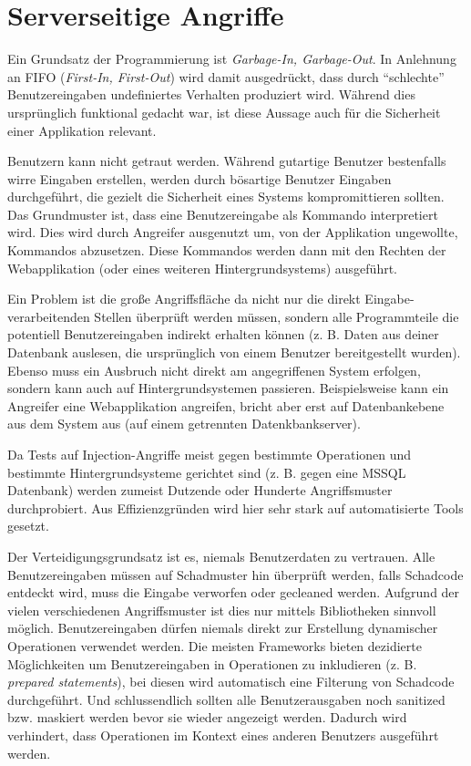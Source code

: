 \chapter{Serverseitige Angriffe}

Ein Grundsatz der Programmierung ist \textit{Garbage-In, Garbage-Out}. In Anlehnung an FIFO (\textit{First-In, First-Out}) wird damit ausgedrückt, dass durch ``schlechte'' Benutzereingaben undefiniertes Verhalten produziert wird. Während dies ursprünglich funktional gedacht war, ist diese Aussage auch für die Sicherheit einer Applikation relevant.

Benutzern kann nicht getraut werden. Während gutartige Benutzer bestenfalls wirre Eingaben erstellen, werden durch bösartige Benutzer Eingaben durchgeführt, die gezielt die Sicherheit eines Systems kompromittieren sollten. Das Grundmuster ist, dass eine Benutzereingabe als Kommando interpretiert wird. Dies wird durch Angreifer ausgenutzt um, von der Applikation ungewollte, Kommandos abzusetzen. Diese Kommandos werden dann mit den Rechten der Webapplikation (oder eines weiteren Hintergrundsystems) ausgeführt.

Ein Problem ist die große Angriffsfläche da nicht nur die direkt Eingabe-verarbeitenden Stellen überprüft werden müssen, sondern alle Programmteile die potentiell Benutzereingaben indirekt erhalten können (z. B. Daten aus deiner Datenbank auslesen, die ursprünglich von einem Benutzer bereitgestellt wurden). Ebenso muss ein Ausbruch nicht direkt am angegriffenen System erfolgen, sondern kann auch auf Hintergrundsystemen passieren. Beispielsweise kann ein Angreifer eine Webapplikation angreifen, bricht aber erst auf Datenbankebene aus dem System aus (auf einem getrennten Datenkbankserver).

Da Tests auf Injection-Angriffe meist gegen bestimmte Operationen und bestimmte Hintergrundsysteme gerichtet sind (z. B. gegen eine MSSQL Datenbank) werden zumeist Dutzende oder Hunderte Angriffsmuster durchprobiert. Aus Effizienzgründen wird hier sehr stark auf automatisierte Tools gesetzt.

Der Verteidigungsgrundsatz ist es, niemals Benutzerdaten zu vertrauen. Alle Benutzereingaben müssen auf Schadmuster hin überprüft werden, falls Schadcode entdeckt wird, muss die Eingabe verworfen oder gecleaned werden. Aufgrund der vielen verschiedenen Angriffsmuster ist dies nur mittels Bibliotheken sinnvoll möglich. Benutzereingaben dürfen niemals direkt zur Erstellung dynamischer Operationen verwendet werden. Die meisten Frameworks bieten dezidierte Möglichkeiten um Benutzereingaben in Operationen zu inkludieren (z. B. \textit{prepared statements}), bei diesen wird automatisch eine Filterung von Schadcode durchgeführt. Und schlussendlich sollten alle Benutzerausgaben noch sanitized bzw. maskiert werden bevor sie wieder angezeigt werden. Dadurch wird verhindert, dass Operationen im Kontext eines anderen Benutzers ausgeführt werden.

